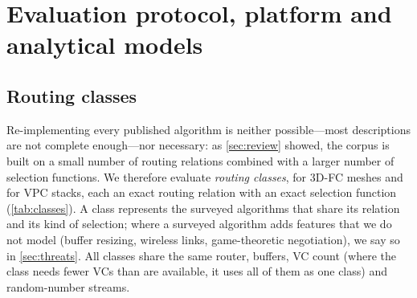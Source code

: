 \section{Evaluation protocol, platform and analytical models}
\label{sec:protocol}

\subsection{Routing classes}
\label{sec:classes}

Re-implementing every published algorithm is neither possible---most descriptions are not complete enough---nor necessary: as \cref{sec:review} showed, the corpus is built on a small number of routing relations combined with a larger number of selection functions. We therefore evaluate  \emph{routing classes},  for 3D-FC meshes and  for VPC stacks, each an exact routing relation with an exact selection function (\cref{tab:classes}). A class represents the surveyed algorithms that share its relation and its kind of selection; where a surveyed algorithm adds features that we do not model (buffer resizing, wireless links, game-theoretic negotiation), we say so in \cref{sec:threats}. All classes share the same router, buffers, VC count (where the class needs fewer VCs than are available, it uses all of them as one class) and random-number streams.


